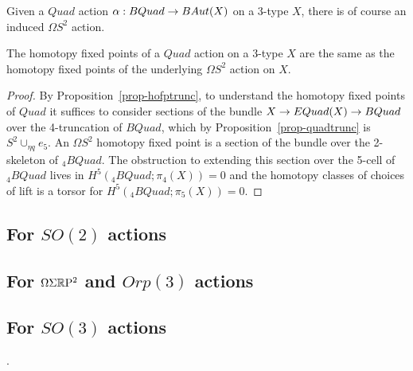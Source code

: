 \documentclass{amsart}
\begin{document}
Given a $Quad$ action $\alpha: BQuad \rightarrow BAut(X)$ on a 3-type $X$, there is of course an induced $\Omega S^2$ action.

\begin{proposition}
The homotopy fixed points of a $Quad$ action on a 3-type $X$ are the same as the homotopy fixed points of the underlying $\Omega S^2$ action on $X$.
\end{proposition}
\begin{proof}
By Proposition~\ref{prop-hofptrunc}, to understand the homotopy fixed points of $Quad$ it suffices to consider sections of the bundle $X \rightarrow EQuad(X) \rightarrow BQuad$ over the 4-truncation of $BQuad$, which by Proposition~\ref{prop-quadtrunc} is $S^2 \cup_{\eta q} e_5$.  An $\Omega S^2$ homotopy fixed point is a section of the bundle over the 2-skeleton of ${}_4 BQuad$.  The obstruction to extending this section over the 5-cell of ${}_4 BQuad$ lives in $H^5({}_4 BQuad;\pi_4(X)) = 0$ and the homotopy classes of choices of lift is a torsor for $H^5({}_4 BQuad;\pi_5(X)) = 0$.
\end{proof}


\subsection{For $SO(2)$ actions}


\subsection{For $\Omega \Sigma \mathbb R \mathrm{P}^2$ and $Orp(3)$ actions}


\subsection{For $SO(3)$ actions}

.
\end{document}
